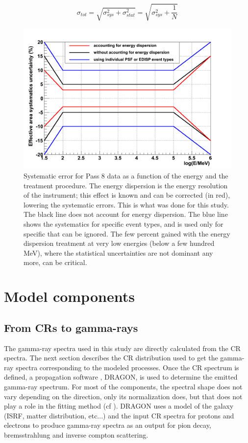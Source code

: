 \begin{equation}
\sigma_{tot} =\sqrt{\sigma_{sys}^2 + \sigma_{stat}^2} = \sqrt{\sigma_{sys}^2 + \frac{1}{N}}
\end{equation}


\begin{figure}[h]
 \centering
 \includegraphics[width=.6\linewidth]{pic/method/LAT_sys_error.png}
 \caption{Systematic error for Pass 8 data as a function of the energy and the treatment procedure. The energy dispersion is the energy resolution of the instrument; this effect is known and can be corrected (in red), lowering the systematic errors. This is what was done for this study. The black line does not account for energy dispersion. The blue line shows the systematics for specific event types, and is used only for specific that can be ignored. The few percent gained with the energy dispersion treatment at very low energies (below a few hundred MeV), where the statistical uncertainties are not dominant any more, can be critical.}
 \label{fig:LAT_sys_err}
\end{figure}




\newpage
\section{Model components}
\subsection{From CRs to gamma-rays}

The gamma-ray spectra used in this study are directly calculated from the CR spectra. The next section describes the CR distribution used to get the gamma-ray spectra corresponding to the modeled processes. Once the CR spectrum is defined, a propagation software \cite{Evoli2008}, DRAGON, is used to determine the emitted gamma-ray spectrum. For most of the components, the spectral shape does not vary depending on the direction, only its normalization does, but that does not play a role in the fitting method (cf ).
DRAGON uses a model of the galaxy (ISRF, matter distribution, etc...) and the input CR spectra for protons and electrons to produce gamma-ray spectra as an output for pion decay, bremsstrahlung and inverse compton scattering.


